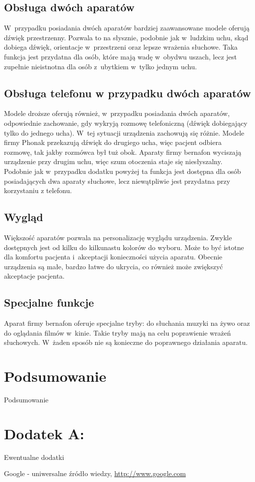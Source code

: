 \documentclass[journal]{IEEEtran}
\begin{document}
\subsection{Obsługa dwóch aparatów}

W~przypadku posiadania dwóch aparatów bardziej zaawansowane modele oferują dźwięk przestrzenny. Pozwala to na słysznie, podobnie jak w~ludzkim uchu, skąd dobiega dźwięk, orientacje w~przestrzeni oraz lepsze wrażenia słuchowe. Taka funkcja jest przydatna dla osób, które mają wadę w~obydwu uszach, lecz jest zupełnie nieistnotna dla osób z~ubytkiem w~tylko jednym uchu.

\subsection{Obsługa telefonu w przypadku dwóch aparatów}

Modele droższe oferują również, w~przypadku posiadania dwóch aparatów, odpowiednie zachowanie, gdy wykryją rozmowę telefoniczną (dźwięk dobiegający tylko do jednego ucha). W~tej sytuacji urządzenia zachowują się różnie. Modele firmy Phonak przekazują dźwięk do drugiego ucha, więc pacjent odbiera rozmowę, tak jakby rozmówca był tuż obok. Aparaty firmy bernafon wyciszają urządzenie przy drugim uchu, więc szum otoczenia staje się niesłyszalny. Podobnie jak w~przypadku dodatku powyżej ta funkcja jest dostępna dla osób posiadających dwa aparaty słuchowe, lecz niewątpliwie jest przydatna przy korzystaniu z telefonu.

\subsection{Wygląd}

Większość aparatów pozwala na personalizację wyglądu urządzenia. Zwykle dostępnych jest od kilku do kilkunastu kolorów do wyboru. Może to być istotne dla komfortu pacjenta i~akceptacji konieczności użycia aparatu. Obecnie urządzenia są małe, bardzo łatwe do ukrycia, co również może zwiększyć akceptacje pacjenta.

\subsection{Specjalne funkcje}

Aparat firmy bernafon oferuje specjalne tryby: do słuchania muzyki na żywo oraz do oglądania filmów w~kinie. Takie tryby mają na celu poprawienie wrażeń słuchowych. W~żaden sposób nie są konieczne do poprawnego działania aparatu. 

\section{Podsumowanie}

Podsumowanie

\section{Dodatek A: }

Ewentualne dodatki


\begin{thebibliography}{123}
    Google - uniwersalne źródło wiedzy,
        \url{http://www.google.com}
\end{thebibliography}
\end{document}
